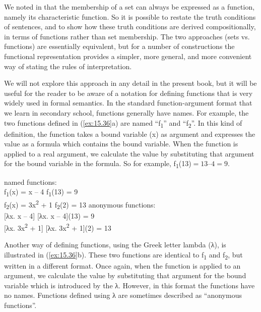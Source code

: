 We noted in  that the membership of a set can always be expressed as a function, namely its characteristic function. So it is possible to restate the truth conditions of sentences, and to show how these truth conditions are derived compositionally, in terms of functions rather than set membership. The two approaches (sets vs. functions) are essentially equivalent, but for a number of constructions the functional representation provides a simpler, more general, and more convenient way of stating the rules of interpretation.



We will not explore this approach in any detail in the present book, but it will be useful for the reader to be aware of a notation for defining functions that is very widely used in formal semantics. In the standard function-argument format that we learn in secondary school, functions generally have names. For example, the two functions defined in (\ref{ex:15.36}a) are named “f\textsubscript{1}” and “f\textsubscript{2}”. In this kind of definition, the function takes a bound variable (x) as argument and expresses the value as a formula which contains the bound variable. When the function is applied to a real argument, we calculate the value by substituting that argument for the bound variable in the formula. So for example, f\textsubscript{1}(13)$ = 13 – 4 = 9$.


\ea \label{ex:15.36}
\ea \label{ex:15.}  named functions:\\
f\textsubscript{1}(x) = x – 4  \hfill f\textsubscript{1}(13) = 9\\
f\textsubscript{2}(x) = 3x\textsuperscript{2} + 1  \hfill f\textsubscript{2}(2) = 13
\ex  anonymous functions:\\
{}[λx. x – 4] \hfill [λx. x – 4](13) = 9\\
{}[λx. 3x\textsuperscript{2} + 1] \hfill [λx. 3x\textsuperscript{2} + 1](2) = 13
\z \z


Another way of defining functions, using the Greek letter lambda (λ), is illustrated in (\ref{ex:15.36}b). These two functions are identical to f\textsubscript{1} and f\textsubscript{2}, but written in a different format. Once again, when the function is applied to an argument, we calculate the value by substituting that argument for the bound variable which is introduced by the λ. However, in this format the functions have no names. Functions defined using λ are sometimes described as “anonymous functions”.




